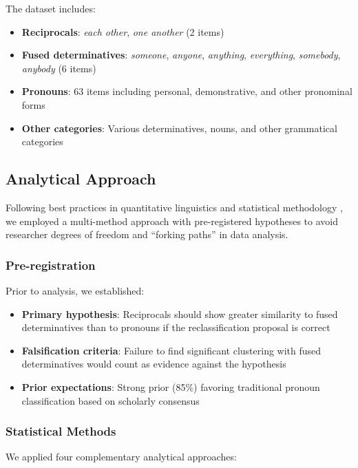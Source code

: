 \documentclass[12pt]{article}
\begin{document}
The dataset includes:
\begin{itemize}
\item \textbf{Reciprocals}: \textit{each other}, \textit{one another} (2 items)
\item \textbf{Fused determinatives}: \textit{someone}, \textit{anyone}, \textit{anything}, \textit{everything}, \textit{somebody}, \textit{anybody} (6 items)
\item \textbf{Pronouns}: 63 items including personal, demonstrative, and other pronominal forms
\item \textbf{Other categories}: Various determinatives, nouns, and other grammatical categories
\end{itemize}

\subsection{Analytical Approach}

Following best practices in quantitative linguistics and statistical methodology \citep{gelman2013bayesian}, we employed a multi-method approach with pre-registered hypotheses to avoid researcher degrees of freedom and ``forking paths'' in data analysis.

\subsubsection{Pre-registration}

Prior to analysis, we established:
\begin{itemize}
\item \textbf{Primary hypothesis}: Reciprocals should show greater similarity to fused determinatives than to pronouns if the reclassification proposal is correct
\item \textbf{Falsification criteria}: Failure to find significant clustering with fused determinatives would count as evidence against the hypothesis
\item \textbf{Prior expectations}: Strong prior (85\%) favoring traditional pronoun classification based on scholarly consensus
\end{itemize}

\subsubsection{Statistical Methods}

We applied four complementary analytical approaches:
\end{document}
